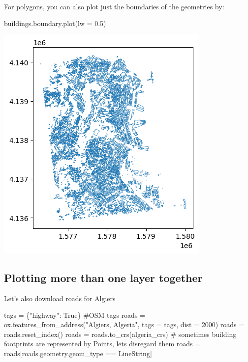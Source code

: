 \documentclass[
  letterpaper,
  DIV=11,
  numbers=noendperiod]{scrreprt}
\newenvironment{Shaded}{\begin{snugshade}}{\end{snugshade}}
\newcommand{\CommentTok}[1]{\textcolor[rgb]{0.37,0.37,0.37}{#1}}
\newcommand{\DecValTok}[1]{\textcolor[rgb]{0.68,0.00,0.00}{#1}}
\newcommand{\FloatTok}[1]{\textcolor[rgb]{0.68,0.00,0.00}{#1}}
\newcommand{\NormalTok}[1]{\textcolor[rgb]{0.00,0.23,0.31}{#1}}
\newcommand{\OperatorTok}[1]{\textcolor[rgb]{0.37,0.37,0.37}{#1}}
\newcommand{\StringTok}[1]{\textcolor[rgb]{0.13,0.47,0.30}{#1}}
\newcommand{\VariableTok}[1]{\textcolor[rgb]{0.07,0.07,0.07}{#1}}
\begin{document}
For polygons, you can also plot just the boundaries of the geometries
by:

\begin{Shaded}
\begin{Highlighting}[]
\NormalTok{buildings.boundary.plot(lw }\OperatorTok{=} \FloatTok{0.5}\NormalTok{)}
\end{Highlighting}
\end{Shaded}

\includegraphics{labs/w02_maps_files/figure-pdf/cell-17-output-1.png}

\subsection{Plotting more than one layer
together}\label{plotting-more-than-one-layer-together}

Let's also download roads for Algiers

\begin{Shaded}
\begin{Highlighting}[]
\NormalTok{tags }\OperatorTok{=}\NormalTok{ \{}\StringTok{"highway"}\NormalTok{: }\VariableTok{True}\NormalTok{\} }\CommentTok{\#OSM tags}
\NormalTok{roads }\OperatorTok{=}\NormalTok{ ox.features\_from\_address(}\StringTok{"Algiers, Algeria"}\NormalTok{, tags }\OperatorTok{=}\NormalTok{ tags, dist }\OperatorTok{=} \DecValTok{2000}\NormalTok{) }
\NormalTok{roads }\OperatorTok{=}\NormalTok{ roads.reset\_index()}
\NormalTok{roads }\OperatorTok{=}\NormalTok{ roads.to\_crs(algeria\_crs)}
 \CommentTok{\# sometimes building footprints are represented by Points, let\textquotesingle{}s disregard them}
\NormalTok{roads }\OperatorTok{=}\NormalTok{ roads[roads.geometry.geom\_type }\OperatorTok{==} \StringTok{\textquotesingle{}LineString\textquotesingle{}}\NormalTok{]}
\end{Highlighting}
\end{Shaded}
\end{document}
